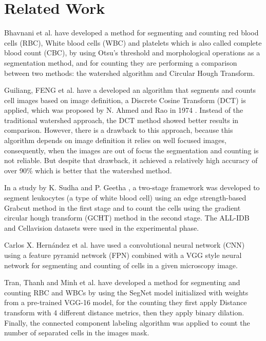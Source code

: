 \documentclass[conference]{IEEEtran}
\begin{document}
\section{Related Work}

Bhavnani et al. \cite{bhavnani2016segmentation} have developed a method for segmenting and counting red blood cells (RBC), White blood cells (WBC) and platelets which is also called complete blood count (CBC), by using Otsu’s threshold and morphological operations as a segmentation method, and for counting they are performing a comparison between two methods: the watershed algorithm and Circular Hough Transform.

Guiliang, FENG et al.\cite{guiliang2016microscopic} have a developed an algorithm that segments and counts cell images based on image definition, a Discrete Cosine Transform (DCT) is applied, which was proposed by N. Ahmed and Rao in 1974 \cite{ahmed1974discrete}. Instead of the traditional watershed approach, the DCT method showed better results in comparison. However, there is a drawback to this approach, because this algorithm depends on image definition it relies on well focused images, consequently, when the images are out of focus the segmentation and counting is not reliable. But despite that drawback, it achieved a relatively high accuracy of over 90\% which is better that the watershed method.

In a study by K. Sudha and P. Geetha \cite{SUDHA2020639}, a two-stage framework was developed to segment leukocytes (a type of white blood cell) using an edge strength-based Grabcut method in the first stage and to count the cells using the gradient circular hough transform (GCHT) method in the second stage. The ALL-IDB \cite{labati2011all} and Cellavision \cite{Zheng2018} datasets were used in the experimental phase.

Carlos X. Hern{\'{a}}ndez et al. \cite{DBLP:journals/corr/abs-1802-10548} have used a convolutional neural network (CNN) using a feature pyramid network (FPN) combined with a VGG style neural network for segmenting and counting of cells in a given microscopy image.

Tran, Thanh and Minh et al. \cite{tran2019blood} have developed a method for segmenting and counting RBC and WBCs by using the SegNet model initialized with weights from a pre-trained VGG-16 model, for the counting they first apply Distance transform with 4 different distance metrics, then they apply binary dilation. Finally, the connected component labeling algorithm was applied to count the number of separated cells in the images mask. 
\end{document}
